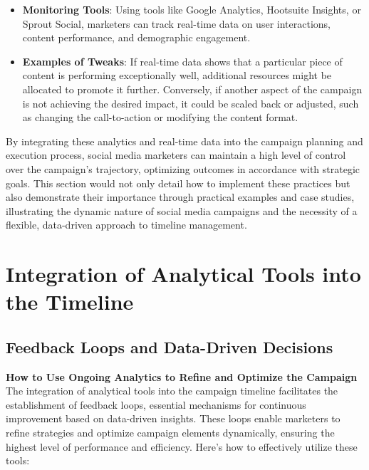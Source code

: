 \documentclass[
]{book}
\providecommand{\tightlist}{%
  \setlength{\itemsep}{0pt}\setlength{\parskip}{0pt}}
\begin{document}
\begin{itemize}
\tightlist
\item
  \textbf{Monitoring Tools}: Using tools like Google Analytics, Hootsuite Insights, or Sprout Social, marketers can track real-time data on user interactions, content performance, and demographic engagement.
\item
  \textbf{Examples of Tweaks}: If real-time data shows that a particular piece of content is performing exceptionally well, additional resources might be allocated to promote it further. Conversely, if another aspect of the campaign is not achieving the desired impact, it could be scaled back or adjusted, such as changing the call-to-action or modifying the content format.
\end{itemize}

By integrating these analytics and real-time data into the campaign planning and execution process, social media marketers can maintain a high level of control over the campaign's trajectory, optimizing outcomes in accordance with strategic goals. This section would not only detail how to implement these practices but also demonstrate their importance through practical examples and case studies, illustrating the dynamic nature of social media campaigns and the necessity of a flexible, data-driven approach to timeline management.

\hypertarget{integration-of-analytical-tools-into-the-timeline}{%
\section{Integration of Analytical Tools into the Timeline}\label{integration-of-analytical-tools-into-the-timeline}}

\hypertarget{feedback-loops-and-data-driven-decisions}{%
\subsection*{Feedback Loops and Data-Driven Decisions}\label{feedback-loops-and-data-driven-decisions}}

\textbf{How to Use Ongoing Analytics to Refine and Optimize the Campaign}
The integration of analytical tools into the campaign timeline facilitates the establishment of feedback loops, essential mechanisms for continuous improvement based on data-driven insights. These loops enable marketers to refine strategies and optimize campaign elements dynamically, ensuring the highest level of performance and efficiency. Here's how to effectively utilize these tools:
\end{document}
